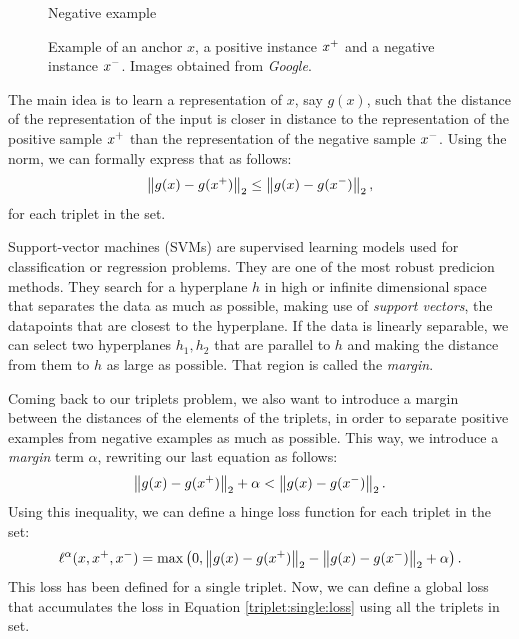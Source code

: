 \begin{nexample}
\begin{figure}[H]
          \caption*{Negative example}\label{fig:doggo}
        \endminipage
        \caption{Example of an anchor $x$, a positive instance $x^+$ and a negative instance $x^-$. Images obtained from \emph{Google}.}
        \end{figure}
    \end{nexample}
    


The main idea is to learn a representation of $x$, say $g(x)$, such that the distance of the representation of the input is closer in distance to the representation of the positive sample $x^+$ than the representation of the negative sample $x^-$. Using the norm\footnotemark, we can formally express that as follows: 
$$
\left\lVert g(x) - g(x^+)\right\rVert_2 \leq \left\lVert g(x) - g(x^-)\right\rVert_2,
$$
for each triplet in the set.




Support-vector machines (SVMs) are supervised learning models used for classification or regression problems. They are one of the most robust predicion methods. They search for a hyperplane $h$ in high or infinite dimensional space that separates the data as much as possible, making use of \emph{support vectors}, the datapoints that are closest to the hyperplane. If the data is linearly separable, we can select two hyperplanes $h_1,h_2$ that are parallel to $h$ and making the distance from them to $h$ as large as possible. That region is called the \emph{margin}.

Coming back to our triplets problem, we also want to introduce a margin between the distances of the elements of the triplets, in order to separate positive examples from negative examples as much as possible. This way, we introduce a \emph{margin} term $\alpha$, rewriting our last equation as follows:
\[
\left\lVert g(x) - g(x^+)\right\rVert_2 + \alpha < \left\lVert g(x) - g(x^-)\right\rVert_2.
\]
Using this inequality, we can define a hinge loss function for each triplet in the set:
\begin{equation}\label{triplet:single:loss}
\ell^\alpha (x,x^+,x^-) = \max \left(0, \left\lVert g(x) - g(x^+)\right\rVert_2 - \left\lVert g(x) - g(x^-)\right\rVert_2 + \alpha\right).
\end{equation}
This loss has been defined for a single triplet. Now, we can define a global loss that accumulates the loss in Equation \eqref{triplet:single:loss} using all the triplets in set.

